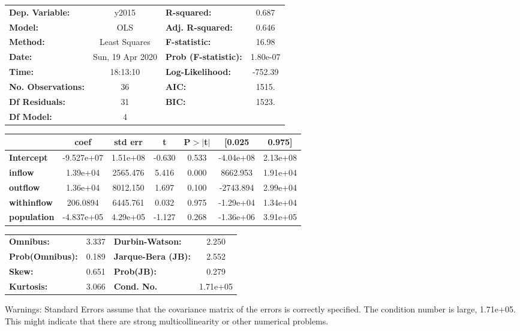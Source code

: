 \begin{center}
\begin{tabular}{lclc}
\toprule
\textbf{Dep. Variable:}    &      y2015       & \textbf{  R-squared:         } &     0.687   \\
\textbf{Model:}            &       OLS        & \textbf{  Adj. R-squared:    } &     0.646   \\
\textbf{Method:}           &  Least Squares   & \textbf{  F-statistic:       } &     16.98   \\
\textbf{Date:}             & Sun, 19 Apr 2020 & \textbf{  Prob (F-statistic):} &  1.80e-07   \\
\textbf{Time:}             &     18:13:10     & \textbf{  Log-Likelihood:    } &   -752.39   \\
\textbf{No. Observations:} &          36      & \textbf{  AIC:               } &     1515.   \\
\textbf{Df Residuals:}     &          31      & \textbf{  BIC:               } &     1523.   \\
\textbf{Df Model:}         &           4      & \textbf{                     } &             \\
\bottomrule
\end{tabular}
\begin{tabular}{lcccccc}
                    & \textbf{coef} & \textbf{std err} & \textbf{t} & \textbf{P$> |$t$|$} & \textbf{[0.025} & \textbf{0.975]}  \\
\midrule
\textbf{Intercept}  &   -9.527e+07  &     1.51e+08     &    -0.630  &         0.533        &    -4.04e+08    &     2.13e+08     \\
\textbf{inflow}     &     1.39e+04  &     2565.476     &     5.416  &         0.000        &     8662.953    &     1.91e+04     \\
\textbf{outflow}    &     1.36e+04  &     8012.150     &     1.697  &         0.100        &    -2743.894    &     2.99e+04     \\
\textbf{withinflow} &     206.0894  &     6445.761     &     0.032  &         0.975        &    -1.29e+04    &     1.34e+04     \\
\textbf{population} &   -4.837e+05  &     4.29e+05     &    -1.127  &         0.268        &    -1.36e+06    &     3.91e+05     \\
\bottomrule
\end{tabular}
\begin{tabular}{lclc}
\textbf{Omnibus:}       &  3.337 & \textbf{  Durbin-Watson:     } &    2.250  \\
\textbf{Prob(Omnibus):} &  0.189 & \textbf{  Jarque-Bera (JB):  } &    2.552  \\
\textbf{Skew:}          &  0.651 & \textbf{  Prob(JB):          } &    0.279  \\
\textbf{Kurtosis:}      &  3.066 & \textbf{  Cond. No.          } & 1.71e+05  \\
\bottomrule
\end{tabular}
\end{center}

Warnings: \newline
 [1] Standard Errors assume that the covariance matrix of the errors is correctly specified. \newline
 [2] The condition number is large, 1.71e+05. This might indicate that there are \newline
 strong multicollinearity or other numerical problems.